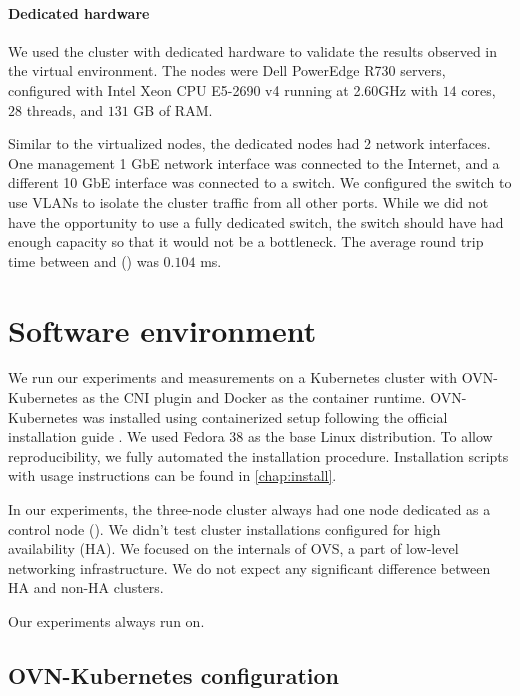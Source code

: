 \paragraph{Dedicated hardware}

We used the cluster with dedicated hardware to validate the results observed in the virtual environment. The nodes were Dell PowerEdge R730 servers, configured with Intel\textsuperscript{\textregistered} Xeon\textsuperscript{\textregistered} CPU E5-2690 v4 running at 2.60GHz with $14$ cores, $28$ threads, and $131$ GB of RAM.

Similar to the virtualized nodes, the dedicated nodes had 2 network interfaces. One management 1 GbE network interface was connected to the Internet, and a different 10 GbE interface was connected to a switch. We configured the switch to use VLANs to isolate the cluster traffic from all other ports. While we did not have the opportunity to use a fully dedicated switch, the switch should have had enough capacity so that it would not be a bottleneck. The average round trip time between  and  () was $0.104$ ms.

\section{Software environment}
\label{sec:sw-env}

We run our experiments and measurements on a Kubernetes cluster with OVN-Kubernetes as the CNI plugin and Docker as the container runtime. OVN-Kubernetes was installed using containerized setup following the official installation guide \cite{OVNInstallGuide}. We used Fedora 38 as the base Linux distribution. To allow reproducibility, we fully automated the installation procedure. Installation scripts with usage instructions can be found in \cref{chap:install}.

In our experiments, the three-node cluster always had one node dedicated as a control node (). We didn't test cluster installations configured for high availability (HA). We focused on the internals of OVS, a part of low-level networking infrastructure. We do not expect any significant difference between HA and non-HA clusters.

Our experiments always run on.

\subsection{OVN-Kubernetes configuration}
\label{subsec:ovnkube-limits}

